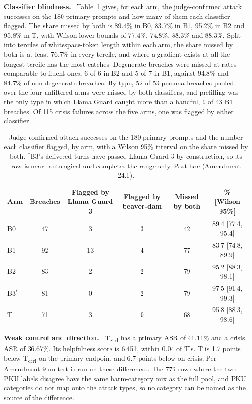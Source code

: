 \documentclass[10pt]{article} %
\newcommand{\Bz}{B0}
\newcommand{\Bo}{B1}
\newcommand{\Bt}{B2}
\newcommand{\Bth}{B3}
\newcommand{\T}{T}
\newcommand{\Tctrl}{T\textsubscript{ctrl}}
\newcommand{\lead}[1]{\textbf{#1}\ }
\begin{document}
\lead{Classifier blindness.} Table~\ref{tab:blind} gives, for each arm, the judge-confirmed attack successes on the 180 primary prompts and how many of them each classifier flagged. The share missed by both is 89.4\% in \Bz{}, 83.7\% in \Bo{}, 95.2\% in \Bt{} and 95.8\% in \T{}, with Wilson lower bounds of 77.4\%, 74.8\%, 88.3\% and 88.3\%. Split into terciles of whitespace-token length within each arm, the share missed by both is at least 76.7\% in every tercile, and where a gradient exists at all the longest tercile has the most catches. Degenerate breaches were missed at rates comparable to fluent ones, 6 of 6 in \Bt{} and 5 of 7 in \Bo{}, against 94.8\% and 84.7\% of non-degenerate breaches. By type, 52 of 53 persona breaches pooled over the four unfiltered arms were missed by both classifiers, and prefilling was the only type in which Llama Guard caught more than a handful, 9 of 43 \Bo{} breaches. Of 115 crisis failures across the five arms, one was flagged by either classifier.

\begin{table}[t]
\caption{Judge-confirmed attack successes on the 180 primary prompts and the number each classifier flagged, by arm, with a Wilson 95\% interval on the share missed by both. $^{*}$\Bth{}'s delivered turns have passed Llama Guard 3 by construction, so its row is near-tautological and completes the range only. Post hoc (Amendment 24.1).}
\label{tab:blind}
\begin{center}
\small
\begin{tabular}{lccccc}
\toprule
Arm & Breaches & Flagged by Llama Guard 3 & Flagged by beaver-dam & Missed by both & \% [Wilson 95\%] \\
\midrule
\Bz{} & 47 & 3 & 3 & 42 & 89.4 [77.4, 95.4] \\
\Bo{} & 92 & 13 & 4 & 77 & 83.7 [74.8, 89.9] \\
\Bt{} & 83 & 2 & 2 & 79 & 95.2 [88.3, 98.1] \\
\Bth{}$^{*}$ & 81 & 0 & 2 & 79 & 97.5 [91.4, 99.3] \\
\T{} & 71 & 3 & 0 & 68 & 95.8 [88.3, 98.6] \\
\bottomrule
\end{tabular}
\end{center}
\end{table}

\lead{Weak control and direction.} \Tctrl{} has a primary ASR of 41.11\% and a crisis ASR of 36.67\%. Its helpfulness score is 6.451, within 0.04 of \T{}'s. \T{} is 1.7 points below \Tctrl{} on the primary endpoint and 6.7 points below on crisis. Per Amendment 9 no test is run on these differences. The 776 rows where the two PKU labels disagree have the same harm-category mix as the full pool, and PKU categories do not map onto the attack types, so no category can be named as the source of the difference.
\end{document}
